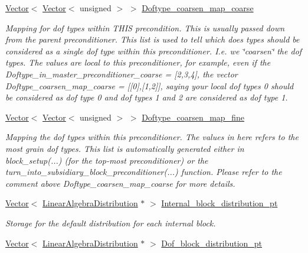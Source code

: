 \begin{DoxyCompactItemize}
\hyperlink{classoomph_1_1Vector}{Vector}$<$ \hyperlink{classoomph_1_1Vector}{Vector}$<$ unsigned $>$ $>$ \hyperlink{classoomph_1_1BlockPreconditioner_a015ba85d839a80512c6c4065e39a3d4a}{Doftype\+\_\+coarsen\+\_\+map\+\_\+coarse}
\begin{DoxyCompactList}\small\item\em Mapping for dof types within T\+H\+IS precondition. This is usually passed down from the parent preconditioner. This list is used to tell which does types should be considered as a single dof type within this preconditioner. I.\+e. we \char`\"{}coarsen\char`\"{} the dof types. The values are local to this preconditioner, for example, even if the Doftype\+\_\+in\+\_\+master\+\_\+preconditioner\+\_\+coarse = \mbox{[}2,3,4\mbox{]}, the vector Doftype\+\_\+coarsen\+\_\+map\+\_\+coarse = \mbox{[}\mbox{[}0\mbox{]},\mbox{[}1,2\mbox{]}\mbox{]}, saying your local dof types 0 should be considered as dof type 0 and dof types 1 and 2 are considered as dof type 1. \end{DoxyCompactList}\item 
\hyperlink{classoomph_1_1Vector}{Vector}$<$ \hyperlink{classoomph_1_1Vector}{Vector}$<$ unsigned $>$ $>$ \hyperlink{classoomph_1_1BlockPreconditioner_aa4e2e47f537f9b6b4deae5792c493d65}{Doftype\+\_\+coarsen\+\_\+map\+\_\+fine}
\begin{DoxyCompactList}\small\item\em Mapping the dof types within this preconditioner. The values in here refers to the most grain dof types. This list is automatically generated either in block\+\_\+setup(...) (for the top-\/most preconditioner) or the turn\+\_\+into\+\_\+subsidiary\+\_\+block\+\_\+preconditioner(...) function. Please refer to the comment above Doftype\+\_\+coarsen\+\_\+map\+\_\+coarse for more details. \end{DoxyCompactList}\item 
\hyperlink{classoomph_1_1Vector}{Vector}$<$ \hyperlink{classoomph_1_1LinearAlgebraDistribution}{Linear\+Algebra\+Distribution} $\ast$ $>$ \hyperlink{classoomph_1_1BlockPreconditioner_a38de6514d7065086335e0e6f60dc77a9}{Internal\+\_\+block\+\_\+distribution\+\_\+pt}
\begin{DoxyCompactList}\small\item\em Storage for the default distribution for each internal block. \end{DoxyCompactList}\item 
\hyperlink{classoomph_1_1Vector}{Vector}$<$ \hyperlink{classoomph_1_1LinearAlgebraDistribution}{Linear\+Algebra\+Distribution} $\ast$ $>$ \hyperlink{classoomph_1_1BlockPreconditioner_a21867eb330dd1177c530a590ad1fa571}{Dof\+\_\+block\+\_\+distribution\+\_\+pt}

\end{DoxyCompactItemize}
